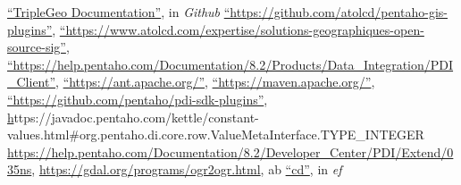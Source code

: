 \begin{thebibliography}{99}
        \href{https://github.com/oeg-upm/geo.linkeddata.es-TripleGeoKettle/wiki}{``TripleGeo Documentation''},
        in \textit{Github}
        \href{https://github.com/atolcd/pentaho-gis-plugins}{``https://github.com/atolcd/pentaho-gis-plugins''},
        \href{https://www.atolcd.com/expertise/solutions-geographiques-open-source-sig}{``https://www.atolcd.com/expertise/solutions-geographiques-open-source-sig''},
        \href{https://help.pentaho.com/Documentation/8.2/Products/Data\_Integration/PDI\_Client}{``https://help.pentaho.com/Documentation/8.2/Products/Data\_Integration/PDI\_Client''},
        \href{https://ant.apache.org/}{``https://ant.apache.org/''},
        \href{https://maven.apache.org/}{``https://maven.apache.org/''},
        \href{https://github.com/pentaho/pdi-sdk-plugins}{``https://github.com/pentaho/pdi-sdk-plugins''},
        \href{https://javadoc.pentaho.com/kettle/constant-values.html#org.pentaho.di.core.row.ValueMetaInterface.TYPE_INTEGER}
        https://javadoc.pentaho.com/kettle/constant-values.html\#org.pentaho.di.core.row.ValueMetaInterface.TYPE\_INTEGER
        \href{https://help.pentaho.com/Documentation/8.2/Developer_Center/PDI/Extend/035}{https://help.pentaho.com/Documentation/8.2/Developer\_Center/PDI/Extend/035ns},
        \href{https://gdal.org/programs/ogr2ogr.html}{https://gdal.org/programs/ogr2ogr.html},
    ab
        \href{}{``cd''},
        in \textit{ef}



\end{thebibliography}

